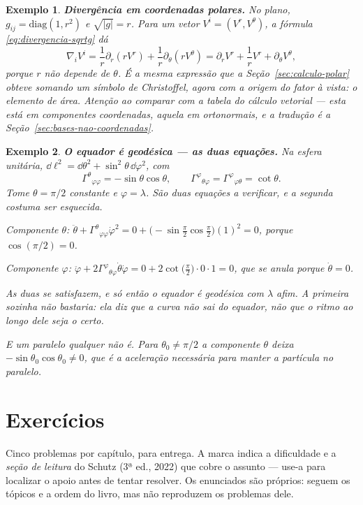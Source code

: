 \documentclass[12pt,a4paper,oneside]{book}
\theoremstyle{rgplain}
\newtheorem{example}{Exemplo}[chapter]
\theoremstyle{rgremark}
\begin{document}
\begin{example}
\textbf{Divergência em coordenadas polares.} No plano,
$g_{ij}=\mathrm{diag}(1,r^2)$ e $\sqrt{|g|}=r$. Para um vetor
$V^i=(V^r,V^\theta)$, a fórmula \eqref{eq:divergencia-sqrtg} dá
\[
  \nabla_iV^i=\frac{1}{r}\partial_r(rV^r)+\frac{1}{r}\partial_\theta(rV^\theta)
  =\partial_rV^r+\frac{1}{r}V^r+\partial_\theta V^\theta ,
\]
porque $r$ não depende de $\theta$. É a mesma expressão que a
Seção~\ref{sec:calculo-polar} obteve somando um símbolo de Christoffel, agora
com a origem do fator à vista: o elemento de área. Atenção ao comparar com a
tabela do cálculo vetorial --- esta está em componentes \emph{coordenadas},
aquela em \emph{ortonormais}, e a tradução é a
Seção~\ref{sec:bases-nao-coordenadas}.
\end{example}

\begin{example}
\textbf{O equador é geodésica --- as duas equações.} Na esfera unitária,
$\dd\ell^2=\dd\theta^2+\sin^2\theta\,\dd\varphi^2$, com
\[
  \Gamma^\theta{}_{\varphi\varphi}=-\sin\theta\cos\theta ,
  \qquad
  \Gamma^\varphi{}_{\theta\varphi}=\Gamma^\varphi{}_{\varphi\theta}=\cot\theta .
\]
Tome $\theta=\pi/2$ constante e $\varphi=\lambda$. São \emph{duas} equações a
verificar, e a segunda costuma ser esquecida.

\emph{Componente $\theta$:}
$\ddot\theta+\Gamma^\theta{}_{\varphi\varphi}\dot\varphi^2
=0+\bigl(-\sin\tfrac\pi2\cos\tfrac\pi2\bigr)(1)^2=0$,
porque $\cos(\pi/2)=0$.

\emph{Componente $\varphi$:}
$\ddot\varphi+2\Gamma^\varphi{}_{\theta\varphi}\dot\theta\dot\varphi
=0+2\cot\bigl(\tfrac\pi2\bigr)\cdot0\cdot1=0$,
que se anula porque $\dot\theta=0$.

As duas se satisfazem, e só então o equador é geodésica \emph{com $\lambda$
afim}. A primeira sozinha não bastaria: ela diz que a curva não sai do
equador, não que o ritmo ao longo dele seja o certo.

\emph{E um paralelo qualquer não é.} Para $\theta_0\ne\pi/2$ a componente
$\theta$ deixa $-\sin\theta_0\cos\theta_0\ne0$, que é a aceleração necessária
para manter a partícula no paralelo.
\end{example}

\clearpage


\clearpage
\section{Exercícios}
\begin{leitura}
Cinco problemas por capítulo, para entrega. A marca indica a dificuldade e a \emph{seção de leitura} do Schutz (3ª ed., 2022) que cobre o assunto --- use-a para localizar o apoio antes de tentar resolver. Os enunciados são próprios: seguem os tópicos e a ordem do livro, mas não reproduzem os problemas dele.
\end{leitura}
\end{document}
